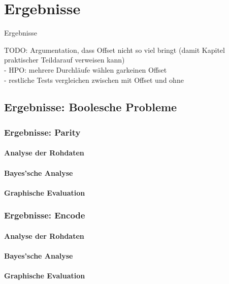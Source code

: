 \chapter{Ergebnisse}
\label{Ergebnisse}
Ergebnisse

TODO: Argumentation, dass Offset nicht so viel bringt (damit Kapitel \glqq praktischer Teil\grqq\space darauf verweisen kann)\\
- HPO: mehrere Durchläufe wählen garkeinen Offset\\
- restliche Tests vergleichen zwischen mit Offset und ohne

\section{Ergebnisse: Boolesche Probleme}
\label{sec:ergebnisseBP}

\subsection{Ergebnisse: Parity}
\label{subsec:ergebnisseParity}
\subsubsection{Analyse der Rohdaten}
\label{parity:analyseRohdaten}
\subsubsection{Bayes'sche Analyse}
\label{parity:bayes}
\subsubsection{Graphische Evaluation}
\label{parity: graphische Evaluation}

\subsection{Ergebnisse: Encode}
\label{subsec:ergebnisseEncode}
\subsubsection{Analyse der Rohdaten}
\label{encode:analyseRohdaten}
\subsubsection{Bayes'sche Analyse}
\label{encode:bayes}
\subsubsection{Graphische Evaluation}
\label{encode: graphische Evaluation}

